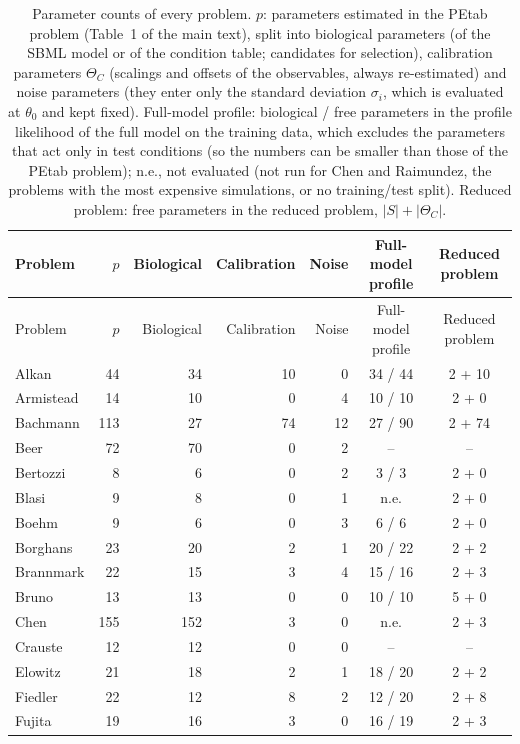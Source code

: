 \begin{longtable}{@{}lrrrrcc@{}}
\caption{Parameter counts of every problem. $p$: parameters estimated in the PEtab problem (Table~1 of the main text), split into biological parameters (of the SBML model or of the condition table; candidates for selection), calibration parameters $\Theta_C$ (scalings and offsets of the observables, always re-estimated) and noise parameters (they enter only the standard deviation $\sigma_i$, which is evaluated at $\theta_0$ and kept fixed). Full-model profile: biological / free parameters in the profile likelihood of the full model on the training data, which excludes the parameters that act only in test conditions (so the numbers can be smaller than those of the PEtab problem); n.e., not evaluated (not run for Chen and Raimundez, the problems with the most expensive simulations, or no training/test split). Reduced problem: free parameters in the reduced problem, $|S|+|\Theta_C|$.}\label{tab:counts}\\
\toprule
Problem & $p$ & Biological & Calibration & Noise & Full-model profile & Reduced problem \\
\midrule
\endfirsthead
\toprule
Problem & $p$ & Biological & Calibration & Noise & Full-model profile & Reduced problem \\
\midrule
\endhead
Alkan & 44 & 34 & 10 & 0 & 34 / 44 & 2 + 10 \\
Armistead & 14 & 10 & 0 & 4 & 10 / 10 & 2 + 0 \\
Bachmann & 113 & 27 & 74 & 12 & 27 / 90 & 2 + 74 \\
Beer & 72 & 70 & 0 & 2 & -- & -- \\
Bertozzi & 8 & 6 & 0 & 2 & 3 / 3 & 2 + 0 \\
Blasi & 9 & 8 & 0 & 1 & n.e. & 2 + 0 \\
Boehm & 9 & 6 & 0 & 3 & 6 / 6 & 2 + 0 \\
Borghans & 23 & 20 & 2 & 1 & 20 / 22 & 2 + 2 \\
Brannmark & 22 & 15 & 3 & 4 & 15 / 16 & 2 + 3 \\
Bruno & 13 & 13 & 0 & 0 & 10 / 10 & 5 + 0 \\
Chen & 155 & 152 & 3 & 0 & n.e. & 2 + 3 \\
Crauste & 12 & 12 & 0 & 0 & -- & -- \\
Elowitz & 21 & 18 & 2 & 1 & 18 / 20 & 2 + 2 \\
Fiedler & 22 & 12 & 8 & 2 & 12 / 20 & 2 + 8 \\
Fujita & 19 & 16 & 3 & 0 & 16 / 19 & 2 + 3 \\

\end{longtable}
